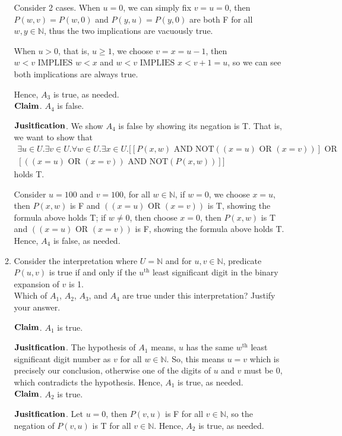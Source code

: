 \documentclass[11pt]{article}
\newcommand{\nnot}{\mathrm{NOT}}
\newcommand{\aand}{\,\,\mathrm{AND}\,\,}
\newcommand{\oor}{\,\,\mathrm{OR}\,\,}
\newcommand{\iimplies}{\,\,\mathrm{IMPLIES}\,\,}
\newcommand{\nats}{\mathbb{N}}
\begin{document}
\begin{enumerate}
\begin{enumerate}
Consider 2 cases. When $u=0$, we can simply fix $v=u=0$, then $P(w,v)=P(w,0)$ and $P(y,u)=P(y,0)$ are both F for all $w,y\in\nats$, thus the two implications are vacuously true.

When $u>0$, that is, $u\geq1$, we choose $v=x=u-1$, then $w<v \iimplies w<x$ and $w<v \iimplies x<v+1=u$, so we can see both implications are always true. 

Hence, $A_3$ is true, as needed.\\

$\bold{Claim}$. $A_4$ is false.

$\bold{Jusitfication}$. We show $A_4$ is false by showing its negation is T. That is, we want to show that \begin{multline*}
    \exists u\in U. \exists v\in U. \forall w\in U. \exists x\in U. [[P(x,w)\aand \nnot ((x=u)\oor(x=v))]\oor\\
    [((x=u)\oor(x=v))\aand \nnot (P(x,w))]] 
\end{multline*} holds T.

Consider $u=100$ and $v=100$, for all $w\in\nats$, if $w=0$, we choose $x=u$, then $P(x,w)$ is F and $((x=u)\oor (x=v))$ is T, showing the formula above holds T; if $w\neq0$, then choose $x=0$, then $P(x,w)$ is T and  $((x=u)\oor (x=v))$ is F, showing the formula above holds T. Hence, $A_4$ is false, as needed.\\



\item Consider the interpretation where $U = \mathbb{N}$ and for $u, v \in \mathbb{N}$, predicate $P(u,v)$ is true if and only if the $u^{\text{th}}$ least significant digit in the binary expansion of $v$ is 1.\\
Which of $A_1$, $A_2$, $A_3$, and $A_4$ are true under this interpretation? Justify your answer.

$\bold{Claim}$. $A_1$ is true.

$\bold{Jusitfication}$. The hypothesis of $A_1$ means, $u$ has the same $w^{\text{th}}$ least significant digit number as $v$ for all $w\in\nats$. So, this means $u=v$ which is precisely our conclusion, otherwise one of the digits of $u$ and $v$ must be 0, which contradicts the hypothesis. Hence, $A_1$ is true, as needed.\\

$\bold{Claim}$. $A_2$ is true.

$\bold{Jusitfication}$. Let $u=0$, then $P(v,u)$ is F for all $v\in\nats$, so the negation of $P(v,u)$ is T for all $v\in\nats$. Hence, $A_2$ is true, as needed.\\


\end{enumerate}
\end{enumerate}
\end{document}
